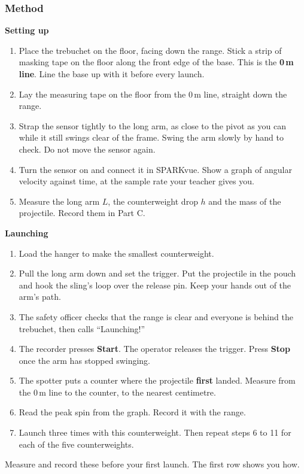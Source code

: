 \documentclass[11pt,a4paper]{article}
\begin{document}
\subsubsection*{Method}
\textbf{Setting up}
\begin{enumerate}[itemsep=1pt]
	\item Place the trebuchet on the floor, facing down the range. Stick a strip of masking tape on the floor along the front edge of the base. This is the \textbf{0\,m line}. Line the base up with it before every launch.
	\item Lay the measuring tape on the floor from the 0\,m line, straight down the range.
	\item Strap the sensor tightly to the long arm, as close to the pivot as you can while it still swings clear of the frame. Swing the arm slowly by hand to check. Do not move the sensor again.
	\item Turn the sensor on and connect it in SPARKvue. Show a graph of angular velocity against time, at the sample rate your teacher gives you.
	\item Measure the long arm $L$, the counterweight drop $h$ and the mass of the projectile. Record them in Part C.
\end{enumerate}
\textbf{Launching}
\begin{enumerate}[itemsep=1pt, resume]
	\item Load the hanger to make the smallest counterweight.
	\item Pull the long arm down and set the trigger. Put the projectile in the pouch and hook the sling's loop over the release pin. Keep your hands out of the arm's path.
	\item The safety officer checks that the range is clear and everyone is behind the trebuchet, then calls ``Launching!''
	\item The recorder presses \textbf{Start}. The operator releases the trigger. Press \textbf{Stop} once the arm has stopped swinging.
	\item The spotter puts a counter where the projectile \textbf{first} landed. Measure from the 0\,m line to the counter, to the nearest centimetre.
	\item Read the peak spin from the graph. Record it with the range.
	\item Launch three times with this counterweight. Then repeat steps 6 to 11 for each of the five counterweights.
\end{enumerate}
\task\label{tk:fixed}Measure and record these before your first launch. The first row shows you how.
\end{document}
